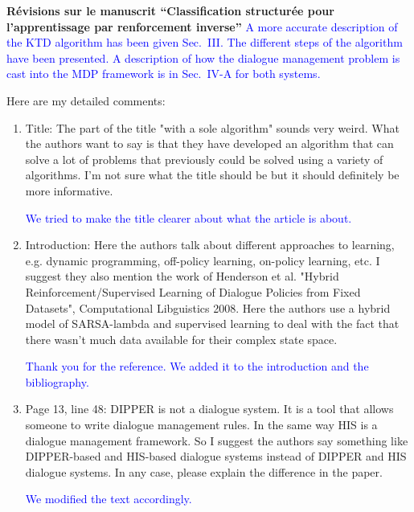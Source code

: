 \documentclass[11pt, a4paper]{letter}
\begin{document}
\begin{letter}{\large \textbf{Révisions sur le manuscrit ``Classification structurée pour l'apprentissage par renforcement inverse''}}
\textcolor{blue}{A more accurate description of the KTD algorithm
has been given Sec.~III. The different steps of the algorithm have
been presented. A description of how the dialogue management problem
is cast into the MDP framework is in Sec.~IV-A for both systems.}

 Here are my detailed comments:

\begin{enumerate}
\item  Title: The part of the title "with a sole algorithm" sounds very weird.
 What the authors want to say is that they have developed an algorithm that
 can solve a lot of problems that previously could be solved using a variety
 of algorithms. I'm not sure what the title should be but it should
 definitely be more informative.

\textcolor{blue}{We tried to make the title clearer about what the
article is about.}


\item Introduction: Here the authors talk about different approaches to learning,
 e.g. dynamic programming, off-policy learning, on-policy learning, etc. I
 suggest they also mention the work of Henderson et al. "Hybrid
 Reinforcement/Supervised Learning of Dialogue Policies from Fixed
 Datasets", Computational Libguistics 2008. Here the authors use a hybrid
 model of SARSA-lambda and supervised learning to deal with the fact that
 there wasn't much data available for their complex state space.

\textcolor{blue}{ Thank you for the reference. We added it to the
introduction and the bibliography.}


\item Page 13, line 48: DIPPER is not a dialogue system. It is a tool that allows
 someone to write dialogue management rules. In the same way HIS is a
 dialogue management framework. So I suggest the authors say something like
 DIPPER-based and HIS-based dialogue systems instead of DIPPER and HIS
 dialogue systems. In any case, please explain the difference in the paper.

\textcolor{blue}{We modified the text accordingly.}


\end{enumerate}
\end{letter}
\end{document}
